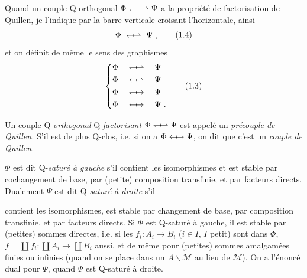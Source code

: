Quand un couple Q-orthogonal $\Phi \Qo \Psi$ a la propriété de factorisation de Quillen, je l'indique par la barre verticale croisant l'horizontale, ainsi
\[
\Phi \ \Qx{\leftharpoondown}{\rightharpoonup} \ \Psi\ ,
\tag*{(1.4)}
\]
et on définit de même le sens des graphismes
\[
\left\{
\begin{aligned}
&\Phi \quad \Qx{\leftharpoondown}{\rightharpoonup} \quad \Psi\\
&\Phi \quad \Qx{\leftarrow}{\rightharpoonup} \quad \Psi\\
&\Phi \quad \Qx{\leftharpoondown}{\rightarrow} \quad \Psi\\
&\Phi \quad \Qx{\leftarrow}{\rightarrow} \quad \Psi\ .
\end{aligned}
\right.
\tag*{(1.3)} %
\]

\newpage


Un couple Q-\textit{orthogonal} Q-\textit{factorisant} $\Phi \Qx{\leftharpoondown}{\rightharpoonup} \Psi$ est appelé un \textit{précouple de Quillen.} S'il est de plus Q-clos, i.e. si on a $\Phi \Qx{\leftarrow}{\rightarrow} \Psi$, on dit que c'est un \textit{couple de Quillen.}

$\Phi$ est dit Q-\textit{saturé à gauche} s'il contient les isomorphismes et est stable par cochangement de base, par (petite) composition transfinie, et par facteurs directs. Dualement $\Psi$ est dit Q-\textit{saturé à droite} s'il


contient les isomorphismes, est stable par changement de base, par composition transfinie, et par facteurs directs. Si $\Phi$ est Q-saturé à gauche, il est stable par (petites) sommes directes, i.e. si les $f_i : A_i \longrightarrow B_i$ ($i \in I$, $I$ petit) sont dans $\Phi$, $f = \coprod f_i : \coprod A_i \longrightarrow \coprod B_i$ aussi, et de même pour (petites) sommes amalgamées finies ou infinies (quand on se place dans un $A\backslash\mathcal{M}$ au lieu de $\mathcal{M}$). On a l'énoncé dual pour $\Psi$, quand $\Psi$ est Q-saturé à droite.

